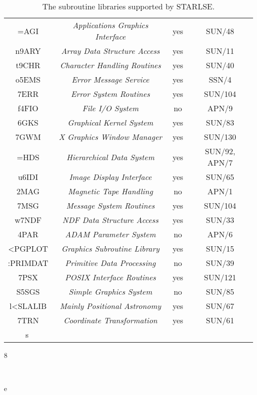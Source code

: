 {\begin{table}
\begin{center}
\begin{tabular}{|c|c|c|c|}
 \hline \hline = AGI & {\em Applications Graphics Interface} & yes & SUN/48 \\n9 ARY & {\em Array Data Structure Access} & yes & SUN/11 \\t9 CHR & {\em Character Handling Routines} & yes & SUN/40 \\o5 EMS & {\em Error Message Service}    & yes & SSN/4 \\ 7 ERR & {\em Error System Routines}    & yes & SUN/104 \\f4 FIO & {\em File I/O System}          & no & APN/9 \\6 GKS & {\em Graphical Kernel System}  & yes & SUN/83 \\7 GWM & {\em X Graphics Window Manager}& yes & SUN/130 \\ = HDS & {\em Hierarchical Data System} & yes & SUN/92, APN/7 \\u6 IDI & {\em Image Display Interface}  & yes & SUN/65 \\2 MAG & {\em Magnetic Tape Handling} & no & APN/1 \\7 MSG & {\em Message System Routines}  & yes & SUN/104 \\w7 NDF & {\em NDF Data Structure Access} & yes & SUN/33 \\ 4 PAR & {\em ADAM Parameter System}    & no & APN/6 \\< PGPLOT & {\em Graphics Subroutine Library} & yes & SUN/15 \\: PRIMDAT & {\em Primitive Data Processing} & no & SUN/39 \\7 PSX & {\em POSIX Interface Routines} & yes & SUN/121 \\S5 SGS & {\em Simple Graphics System}   & no & SUN/85 \\l< SLALIB & {\em Mainly Positional Astronomy} & yes & SUN/67 \\7 TRN & {\em Coordinate Transformation} & yes & SUN/61 \\s \hline
 \end{tabular} 8 \caption{The subroutine libraries supported by STARLSE.} \label{table:status} \end{center} \end{table}e  %
}
